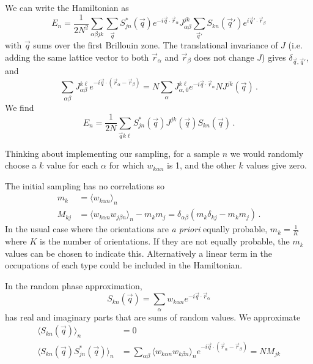 \documentclass[12pt]{article}
\begin{document}
We can write the Hamiltonian as
\begin{equation}
E_n = \frac{1}{2N^2}\sum_{\alpha\beta jk}
\sum_{\vec q} S^*_{jn}(\vec q) e^{-i\vec q\cdot \vec r_\alpha}
J^{jk}_{\alpha\beta} \sum_{\vec q'} S_{kn}(\vec q')
e^{i\vec q'\cdot\vec r_\beta}
\end{equation}
with $\vec q$ sums over the first Brillouin zone. The translational
invariance of $J$ (i.e. adding the same lattice vector to both
$\vec r_\alpha$ and $\vec r_\beta$ does not change $J$) gives
$\delta_{\vec q,\vec q'}$,
and
\begin{equation}
\sum_{\alpha\beta} J^{k\ell}_{\alpha\beta}
e^{-i\vec q\cdot(\vec r_\alpha-\vec r_\beta)}
= N\sum_\alpha J^{k\ell}_{\alpha,0} e^{-i\vec q\cdot\vec r_\alpha}
N J^{jk}(\vec q) \,.
\end{equation}
We find
\begin{equation}
E_n = \frac{1}{2N}\sum_{\vec q k\ell}
S^*_{jn}(\vec q) J^{jk}(\vec q) S_{kn}(\vec q) \,.
\end{equation}

Thinking about implementing our sampling, for a sample $n$
we would randomly choose a $k$ value for each $\alpha$ for which
$w_{k\alpha n}$ is 1, and the other $k$ values give zero.

The initial sampling has no correlations so
\begin{equation}
\begin{split}
m_k &=\langle w_{k\alpha n} \rangle_n
\\
M_{kj} &= \langle w_{k\alpha n}w_{j\beta n}\rangle_n-m_k m_j =
\delta_{\alpha\beta}
\left (m_k \delta_{kj}-m_k m_j\right ) \,.
\end{split}
\end{equation}
In the usual case where
the orientations are {\em a priori} equally probable, $m_k = \frac{1}{K}$
where $K$ is the number of orientations. If they are not equally
probable, the $m_k$ values can be chosen to indicate this.
Alternatively a linear term in
the occupations of each type could be included in the Hamiltonian.

In the random phase approximation,
\begin{equation}
S_{kn}(\vec q) = \sum_\alpha w_{k\alpha n} e^{-i\vec q \cdot \vec r_\alpha}
\end{equation}
has real and imaginary parts that are
sums of random values. We approximate
\begin{equation}
\begin{split}
\langle S_{kn}(\vec q)\rangle_n &= 0
\\
\langle S_{kn}(\vec q)S^*_{jn}(\vec q)\rangle_n &= 
\sum_{\alpha\beta} \langle w_{k\alpha n} w_{k\beta n}\rangle_n
e^{-i\vec q \cdot 
(\vec r_\alpha-\vec r_\beta)} = NM_{jk}
\end{split}
\end{equation}
\end{document}
